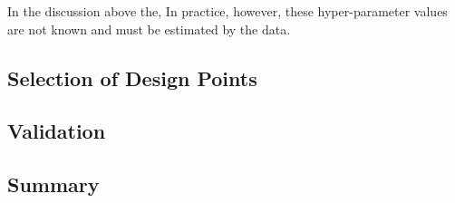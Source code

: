 In the discussion above the,
In practice, however, these hyper-parameter values are not known and must be estimated by the data.






\subsection{Selection of Design Points}\label{sub:gp_design}

\subsection{Validation}\label{sub:gp_validation}

\subsection{Summary}\label{sub:gp_summary}